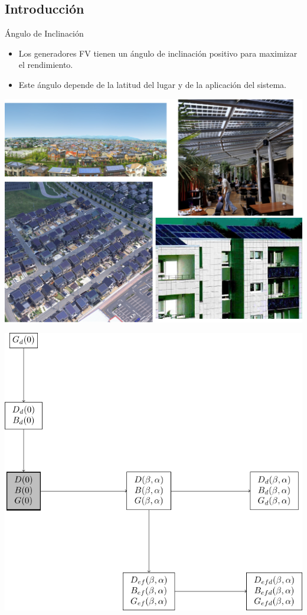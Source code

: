 \documentclass[xcolor={usenames,svgnames,dvipsnames}]{beamer}
\begin{document}
\subsection{Introducción}
\label{sec:org93b0dda}

\begin{frame}[label={sec:orgf067128}]{Ángulo de Inclinación}
\begin{itemize}
\item Los generadores FV tienen un ángulo de inclinación positivo para maximizar el rendimiento.
\item Este ángulo depende de la latitud del lugar y de la aplicación del sistema.
\end{itemize}

\begin{center}
\includegraphics[height=0.5\textheight]{../figs/PVUrban.png}
\end{center}
\end{frame}

\begin{frame}[label={sec:org0d2d0bd}]{}
\begin{center}
\includegraphics[width=.9\linewidth]{../figs/ProcedimientoCalculoRadiacionInclinada_perfil.pdf}
\end{center}
\end{frame}
\end{document}
